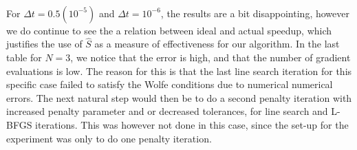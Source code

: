 \\
For $\Delta t = 0.5(10^{-5})$ and $\Delta t = 10^{-6}$, the results are a bit disappointing, however we do continue to see the a relation between ideal and actual speedup, which justifies the use of $\hat S$ as a measure of effectiveness for our algorithm. In the last table for $N=3$, we notice that the error is high, and that the number of gradient evaluations is low. The reason for this is that the last line search iteration for this specific case failed to satisfy the Wolfe conditions due to numerical numerical errors. The next natural step would then be to do a second penalty iteration with increased penalty parameter and or decreased tolerances, for line search and L-BFGS iterations. This was however not done in this case, since the set-up for the experiment was only to do one penalty iteration.